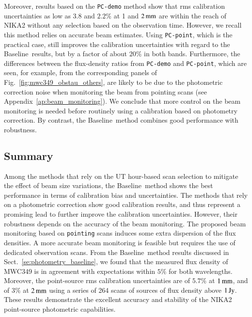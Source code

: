 \documentclass[traditionalabstract]{aa}
\newcommand{\baseline}{Baseline}%
\newcommand{\lp}[1]{#1}
\newcommand{\rev}[1]{#1}
\begin{document}
{Moreover, results based on the {\tt PC-demo} method show that rms
calibration uncertainties as low as $3.8$ and $2.2\%$
at 1 and $2\,\rm{mm}$ are within the reach of NIKA2 {\lp without any
selection based on the observation time.}
However, we recall this method relies on 
accurate beam estimates. Using {\tt PC-point}, which is the
practical case, still improves the calibration uncertainties
with regard to the \baseline\ results, but by a factor of about $20\%$ in both
bands. Furthermore, the differences between
the flux-density ratios from {\tt PC-demo} and {\tt PC-point}, which are
seen, for example, from the corresponding panels of
Fig.~\ref{fig:mwc349_obstau_others}, are likely
to be due to the photometric correction noise
when monitoring the beam from pointing scans (see
Appendix~\ref{ap:beam_monitoring}). We conclude that more
control on the beam monitoring is needed before routinely using a calibration
based on photometry correction. By contrast, the \baseline\ method
combines good performance with robustness.


\subsection{Summary}
\label{se:photometry_summary}
Among the methods that rely on the UT hour-based
scan selection to mitigate the effect of beam size variations, the
\baseline\ method shows the best performance in terms of calibration
bias and uncertainties. The methods that rely on a photometric correction
show good calibration results, and thus represent a promising lead
to further improve the calibration uncertainties. However, their
robustness depends on the accuracy of the beam monitoring. {\lp The
proposed beam monitoring based on {\tt pointing} scans induces some
extra dispersion of the flux densities. A more accurate beam monitoring is
feasible but requires the use of dedicated observation scans.} 
From the \baseline\ method results discussed in
Sect.~\ref{se:photometry_baseline}, we found that the measured
flux density of MWC349 is in agreement with expectations within $5\%$
for both wavelengths. Moreover, the {\rev point-source} rms calibration
uncertainties are of $5.7\%$ at $1\,\rm{mm}$, and of $3\%$ at $2\,\rm{mm}$
using a series of 264 scans of sources of flux density above
$1\, \rm{Jy}$.
These results demonstrate the excellent accuracy and stability of the
NIKA2 {\rev point-source} photometric capabilities.

}
\end{document}
